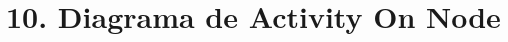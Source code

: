 \documentclass[
11pt, %
]{charter}
\begin{document}
%
%
%
%

\section{10. Diagrama de Activity On Node}
\label{sec:AoN}

%
%
%
\end{document}
